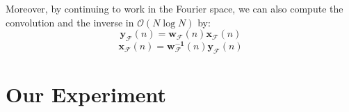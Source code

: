 Moreover, by continuing to work in the Fourier space, we can also compute the convolution and the inverse in $\mathcal{O}(N \log N)$ by:
\begin{equation}
	\mathbf{y_\mathcal{F}}(n) = \mathbf{w_\mathcal{F}}(n)\mathbf{x_\mathcal{F}}(n)
\end{equation}
\begin{equation}
	\mathbf{x_\mathcal{F}}(n) = \mathbf{w_\mathcal{F}^{-1}}(n)\mathbf{y_\mathcal{F}}(n)
\end{equation}

\section{Our Experiment}
